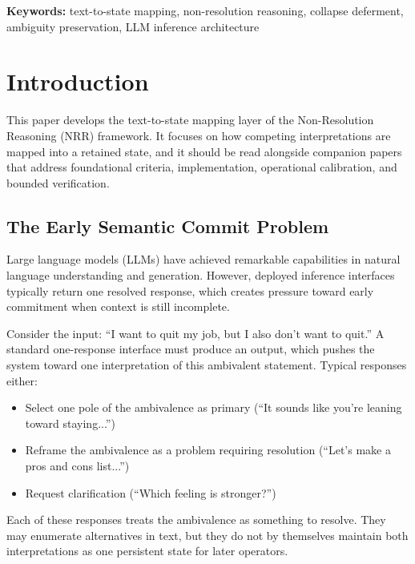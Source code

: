 \documentclass[11pt,a4paper]{article}
\begin{document}
\noindent\textbf{Keywords:} text-to-state mapping, non-resolution reasoning, collapse deferment, 
ambiguity preservation, LLM inference architecture

\section{Introduction}
\label{sec:intro}

This paper develops the text-to-state mapping layer of the Non-Resolution Reasoning (NRR) framework. It focuses on how competing interpretations are mapped into a retained state, and it should be read alongside companion papers that address foundational criteria, implementation, operational calibration, and bounded verification.

\subsection{The Early Semantic Commit Problem}

Large language models (LLMs) have achieved remarkable capabilities in natural language 
understanding and generation. However, deployed inference interfaces typically return
one resolved response, which creates pressure toward early commitment when context is
still incomplete.

Consider the input: ``I want to quit my job, but I also don't want to quit.'' 
A standard one-response interface must produce an output, which pushes the system toward
one interpretation of this ambivalent statement. Typical responses either:
\begin{itemize}
    \item Select one pole of the ambivalence as primary (``It sounds like you're leaning toward staying...'')
    \item Reframe the ambivalence as a problem requiring resolution (``Let's make a pros and cons list...'')
    \item Request clarification (``Which feeling is stronger?'')
\end{itemize}

Each of these responses treats the ambivalence as something to resolve. They may
enumerate alternatives in text, but they do not by themselves maintain both
interpretations as one persistent state for later operators.
\end{document}
